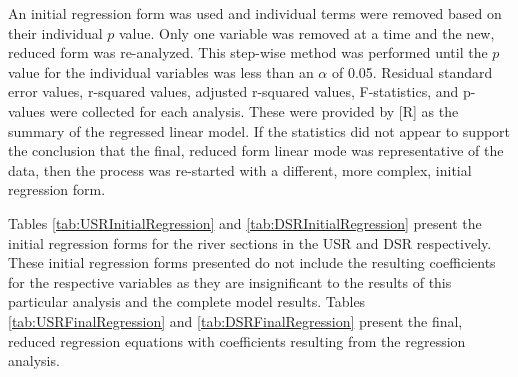 \begin{linenumbers}
An initial regression form was used and individual terms were removed based on their individual $p$ value.  Only one variable was removed at a time and the new, reduced form was re-analyzed.  This step-wise method was performed until the $p$ value for the individual variables was less than an $\alpha$ of 0.05.  Residual standard error values, r-squared values, adjusted r-squared values, F-statistics, and p-values were collected for each analysis.  These were provided by [R] as the summary of the regressed linear model.  If the statistics did not appear to support the conclusion that the final, reduced form linear mode was representative of the data, then the process was re-started with a different, more complex, initial regression form.  

Tables \ref{tab:USRInitialRegression} and \ref{tab:DSRInitialRegression} present the initial regression forms for the river sections in the USR and DSR respectively. These initial regression forms presented do not include the resulting coefficients for the respective variables as they are insignificant to the results of this particular analysis and the complete model results.  Tables \ref{tab:USRFinalRegression} and \ref{tab:DSRFinalRegression} present the final, reduced regression equations with coefficients resulting from the regression analysis.


\end{linenumbers}

